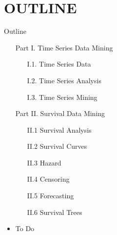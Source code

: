 \documentclass[handout]{beamer}
\begin{document}
\section*{OUTLINE}
\begin{frame}{Outline}
\begin{itemize}
\item[] Part I. Time Series Data Mining
	\begin{itemize}
    \item[I.1.] Time Series Data
    \item[I.2.] Time Series Analysis
    \item[I.3.] Time Series Mining
	\end{itemize}
\item[] Part II. Survival Data Mining
	\begin{itemize}
    \item[II.1] Survival Analysis
    \item[II.2] Survival Curves
    \item[II.3] Hazard
    \item[II.4] Censoring
    \item[II.5] Forecasting
    \item[II.6] Survival Trees
	\end{itemize}
\vspace*{0.3cm}
\item To Do
\end{itemize}
\end{frame}


\end{document}
